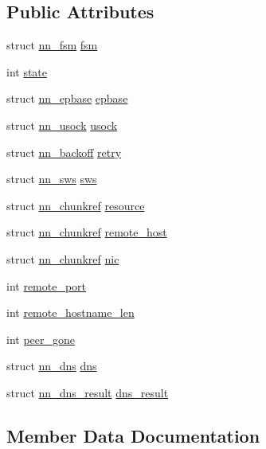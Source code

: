 \subsection*{Public Attributes}
\begin{DoxyCompactItemize}
\item 
struct \hyperlink{structnn__fsm}{nn\+\_\+fsm} \hyperlink{structnn__cws_a41c2cbb214b831321536bac975a001d1}{fsm}
\item 
int \hyperlink{structnn__cws_a95ff0b16ec166d1a8d4f3fab57d4a377}{state}
\item 
struct \hyperlink{structnn__epbase}{nn\+\_\+epbase} \hyperlink{structnn__cws_a6826c5e288398b8ce02bbd50fad890f6}{epbase}
\item 
struct \hyperlink{structnn__usock}{nn\+\_\+usock} \hyperlink{structnn__cws_afc94a8982678a15880a4e997e5ce7ee4}{usock}
\item 
struct \hyperlink{structnn__backoff}{nn\+\_\+backoff} \hyperlink{structnn__cws_a8abca9d2933ce61f56641f952b0c17a4}{retry}
\item 
struct \hyperlink{structnn__sws}{nn\+\_\+sws} \hyperlink{structnn__cws_a21c4c5f3afc0ac138b98bb1873457e6f}{sws}
\item 
struct \hyperlink{structnn__chunkref}{nn\+\_\+chunkref} \hyperlink{structnn__cws_ab87056e9f72028a8f06cca5e70de0c19}{resource}
\item 
struct \hyperlink{structnn__chunkref}{nn\+\_\+chunkref} \hyperlink{structnn__cws_a16a80129a6f9da75ace4d1b56d6f0287}{remote\+\_\+host}
\item 
struct \hyperlink{structnn__chunkref}{nn\+\_\+chunkref} \hyperlink{structnn__cws_ae43be2ce7b2083ca18e84472b0e67628}{nic}
\item 
int \hyperlink{structnn__cws_aed169e371de5fe39b8b21afcd4beaf4d}{remote\+\_\+port}
\item 
int \hyperlink{structnn__cws_abcddd98595f33963529039f615e70c59}{remote\+\_\+hostname\+\_\+len}
\item 
int \hyperlink{structnn__cws_a953699c3a7fc6c8addf3379489a0efbd}{peer\+\_\+gone}
\item 
struct \hyperlink{structnn__dns}{nn\+\_\+dns} \hyperlink{structnn__cws_aa6087b33d2a780cb5b5d7f56e1819d60}{dns}
\item 
struct \hyperlink{structnn__dns__result}{nn\+\_\+dns\+\_\+result} \hyperlink{structnn__cws_a08c7413b29dea92196ccfa67753cb471}{dns\+\_\+result}
\end{DoxyCompactItemize}


\subsection{Member Data Documentation}
